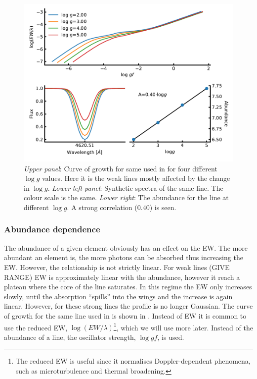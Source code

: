\begin{figure}[htpb!]
    \centering
    \includegraphics[width=0.85\linewidth]{figures/ewGravity.pdf}
    \caption{\emph{Upper panel}: Curve of growth for same  used in  for
                                 four different $\log g$ values. Here it is the weak lines mostly
                                 affected by the change in $\log g$.
             \emph{Lower left panel}: Synthetic spectra of the same line. The colour scale is the
                                      same.
             \emph{Lower right}: The abundance for the line at different $\log g$. A strong
                                 correlation (0.40) is seen.}
    \label{fig:ewGravity}
\end{figure}




\subsubsection{Abundance dependence}

The abundance of a given element obviously has an effect on the EW. The more abundant an element is,
the more photons can be absorbed thus increasing the EW. However, the relationship is not strictly
linear. For weak lines (GIVE RANGE) EW is approximately linear with the abundance, however it reach
a plateau where the core of the line saturates. In this regime the EW only increases slowly, until
the absorption ``spills'' into the wings and the increase is again linear. However, for these strong
lines the profile is no longer Gaussian. The curve of growth for the same  line used in
 is shown in . Instead of EW it is common to use the reduced EW,
$\log (EW/\lambda)$\footnote{The reduced EW is useful since it normalises Doppler-dependent
phenomena, such as microturbulence and thermal broadening.}, which we will use more later. Instead
of the abundance of a line, the oscillator strength, $\log \mathit{gf}$, is used.

